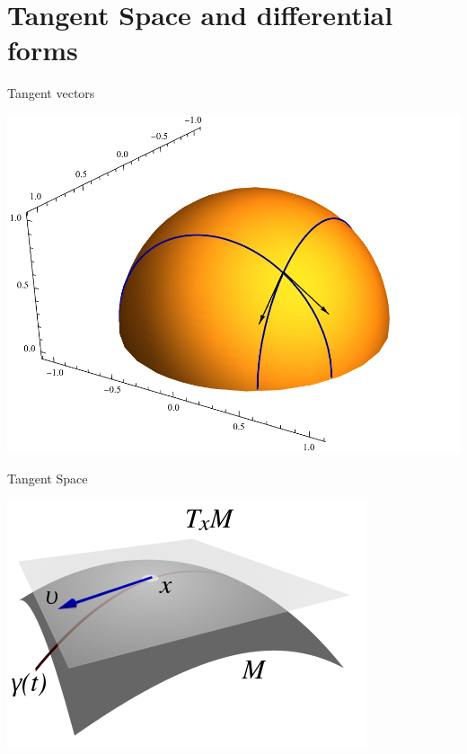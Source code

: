 \documentclass[9pt]{beamer}
\begin{document}
\section{Tangent Space and differential forms}
\begin{frame}{Tangent vectors}
\begin{center}
    \includegraphics[scale=0.4]{uppersphere.png}
\end{center}
\end{frame}

\begin{frame}{Tangent Space}
    \begin{center}
        
    \includegraphics[scale=0.5]{tangent_space.png}
    \end{center}
\end{frame}
\end{document}
